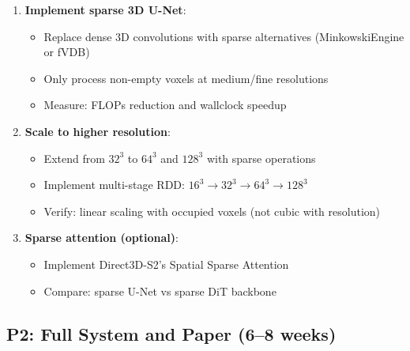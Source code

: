 \documentclass[11pt, a4paper]{article}
\begin{document}
\begin{enumerate}
    \item \textbf{Implement sparse 3D U-Net}:
    \begin{itemize}
        \item Replace dense 3D convolutions with sparse alternatives (MinkowskiEngine or fVDB)
        \item Only process non-empty voxels at medium/fine resolutions
        \item Measure: FLOPs reduction and wallclock speedup
    \end{itemize}
    
    \item \textbf{Scale to higher resolution}:
    \begin{itemize}
        \item Extend from $32^3$ to $64^3$ and $128^3$ with sparse operations
        \item Implement multi-stage RDD: $16^3 \to 32^3 \to 64^3 \to 128^3$
        \item Verify: linear scaling with occupied voxels (not cubic with resolution)
    \end{itemize}
    
    \item \textbf{Sparse attention (optional)}:
    \begin{itemize}
        \item Implement Direct3D-S2's Spatial Sparse Attention
        \item Compare: sparse U-Net vs sparse DiT backbone
    \end{itemize}
\end{enumerate}

\subsection{P2: Full System and Paper (6--8 weeks)}
\end{document}
